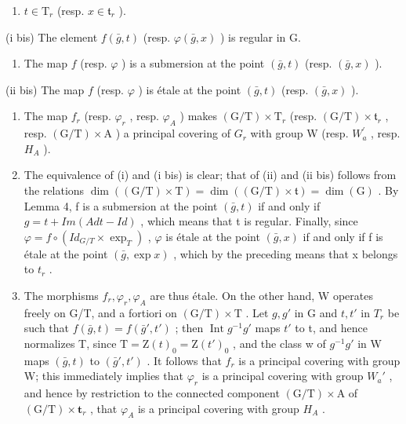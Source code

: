 \begin{enumerate}
\def\labelenumi{(\roman{enumi})}
\tightlist
\item
  \(t \in \mathrm{T}_r\) (resp. \(x \in \mathfrak{t}_r\) ).
\end{enumerate}

(i bis) The element \(f(\bar{g}, t)\) (resp. \(\varphi(\bar{g}, x)\) ) is regular in G.

\begin{enumerate}
\def\labelenumi{(\roman{enumi})}
\setcounter{enumi}{1}
\tightlist
\item
  The map \(f\) (resp. \(\varphi\) ) is a submersion at the point \((\bar{g}, t)\) (resp. \((\bar{g}, x)\) ).
\end{enumerate}

(ii bis) The map \(f\) (resp. \(\varphi\) ) is étale at the point \((\bar{g}, t)\) (resp. \((\bar{g}, x)\) ).

\begin{enumerate}
\def\labelenumi{\alph{enumi})}
\setcounter{enumi}{1}
\item
  The map \(f_{r}\) (resp. \(\varphi_{r}\) , resp. \(\varphi_{A}\) ) makes \((\mathrm{G}/\mathrm{T}) \times \mathrm{T}_{r}\) (resp. \((\mathrm{G}/\mathrm{T}) \times \mathfrak{t}_{r}\) , resp. \((\mathrm{G}/\mathrm{T}) \times \mathrm{A}\) ) a principal covering of \(G_{r}\) with group W (resp. \(W_{a}^{\prime}\) , resp. \(H_{A}\) ).
\item
  The equivalence of (i) and (i bis) is clear; that of (ii) and (ii bis) follows from the relations \(\dim((\mathrm{G}/\mathrm{T})\times\mathrm{T})=\dim((\mathrm{G}/\mathrm{T})\times\mathfrak{t})=\dim(\mathrm{G})\) . By Lemma 4, f is a submersion at the point \((\bar{g},t)\) if and only if \(g=t+Im(Ad t-Id)\) , which means that t is regular. Finally, since \(\varphi=f\circ(Id_{G/T}\times\exp_{T})\) , \(\varphi\) is étale at the point \((\bar{g},x)\) if and only if f is étale at the point \((\bar{g},\exp x)\) , which by the preceding means that x belongs to \(t_{r}\) .
\item
  The morphisms \(f_{r}, \varphi_{r}, \varphi_{A}\) are thus étale. On the other hand, W operates freely on G/T, and a fortiori on \((\mathrm{G}/\mathrm{T}) \times \mathrm{T}\) . Let \(g, g'\) in G and \(t, t'\) in \(T_{r}\) be such that \(f(\bar{g}, t) = f(\bar{g}', t')\) ; then \(\operatorname{Int} g^{-1} g'\) maps \(t'\) to t, and hence normalizes T, since \(\mathrm{T} = \mathrm{Z}(t)_{0} = \mathrm{Z}(t')_{0}\) , and the class w of \(g^{-1} g'\) in W maps \((\bar{g}, t)\) to \((\bar{g}', t')\) . It follows that \(f_{r}\) is a principal covering with group W; this immediately implies that \(\varphi_{r}\) is a principal covering with group \(W_{a}'\) , and hence by restriction to the connected component \((\mathrm{G}/\mathrm{T}) \times \mathrm{A}\) of \((\mathrm{G}/\mathrm{T}) \times \mathbf{t}_{r}\) , that \(\varphi_{A}\) is a principal covering with group \(H_{A}\) .
\end{enumerate}

